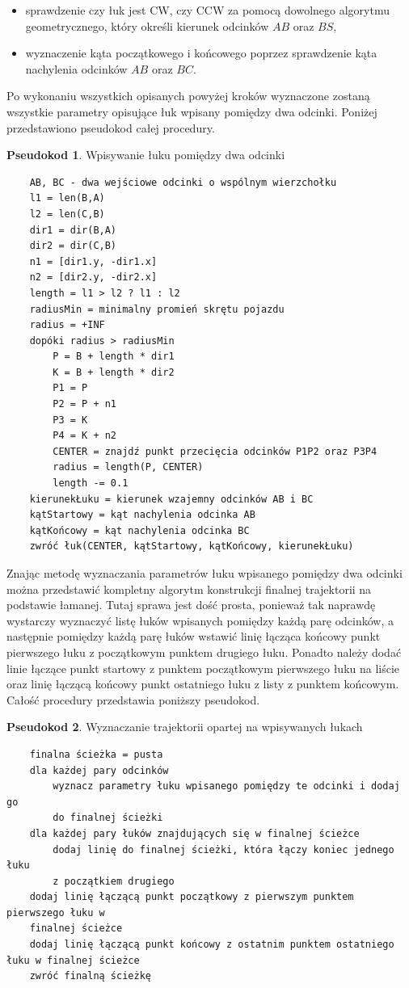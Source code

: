\documentclass[a4paper,11pt,twoside]{report}
\theoremstyle{definition}
\newtheorem{pseudokod}{Pseudokod}[subsection]
\begin{document}
\begin{itemize}
	\item sprawdzenie czy łuk jest CW, czy CCW za pomocą dowolnego algorytmu geometrycznego, który określi kierunek odcinków $AB$ oraz $BS$,
	\item wyznaczenie kąta początkowego i końcowego poprzez sprawdzenie kąta nachylenia odcinków $AB$ oraz $BC$.

\end{itemize}

Po wykonaniu wszystkich opisanych powyżej kroków wyznaczone zostaną wszystkie parametry opisujące łuk wpisany pomiędzy dwa odcinki. Poniżej przedstawiono pseudokod całej procedury.

\begin{pseudokod}
Wpisywanie łuku pomiędzy dwa odcinki
\begin{verbatim}
    AB, BC - dwa wejściowe odcinki o wspólnym wierzchołku
    l1 = len(B,A)
    l2 = len(C,B)
    dir1 = dir(B,A)
    dir2 = dir(C,B)
    n1 = [dir1.y, -dir1.x]
    n2 = [dir2.y, -dir2.x]
    length = l1 > l2 ? l1 : l2
    radiusMin = minimalny promień skrętu pojazdu
    radius = +INF
    dopóki radius > radiusMin
        P = B + length * dir1
        K = B + length * dir2
        P1 = P
        P2 = P + n1
        P3 = K
        P4 = K + n2
        CENTER = znajdź punkt przecięcia odcinków P1P2 oraz P3P4
        radius = length(P, CENTER)  
        length -= 0.1
    kierunekŁuku = kierunek wzajemny odcinków AB i BC
    kątStartowy = kąt nachylenia odcinka AB
    kątKońcowy = kąt nachylenia odcinka BC
    zwróć łuk(CENTER, kątStartowy, kątKońcowy, kierunekŁuku)
\end{verbatim}
\end{pseudokod}

Znając metodę wyznaczania parametrów łuku wpisanego pomiędzy dwa odcinki można przedstawić kompletny algorytm konstrukcji finalnej trajektorii na podstawie łamanej. Tutaj sprawa jest dość prosta, ponieważ tak naprawdę wystarczy wyznaczyć listę łuków wpisanych pomiędzy każdą parę odcinków, a następnie pomiędzy każdą parę łuków wstawić linię łącząca końcowy punkt pierwszego łuku z początkowym punktem drugiego łuku. Ponadto należy dodać linie łączące punkt startowy z punktem początkowym pierwszego łuku na liście oraz linię łączącą końcowy punkt ostatniego łuku z listy z punktem końcowym. Całość procedury przedstawia poniższy pseudokod.

\begin{pseudokod}
Wyznaczanie trajektorii opartej na wpisywanych łukach
\begin{verbatim}
    finalna ścieżka = pusta
    dla każdej pary odcinków
        wyznacz parametry łuku wpisanego pomiędzy te odcinki i dodaj go 
        do finalnej ścieżki
    dla każdej pary łuków znajdujących się w finalnej ścieżce
        dodaj linię do finalnej ścieżki, która łączy koniec jednego łuku 
        z początkiem drugiego
    dodaj linię łączącą punkt początkowy z pierwszym punktem pierwszego łuku w 
    finalnej ścieżce
    dodaj linię łączącą punkt końcowy z ostatnim punktem ostatniego łuku w finalnej ścieżce
    zwróć finalną ścieżkę
\end{verbatim}
\end{pseudokod}
\end{document}
